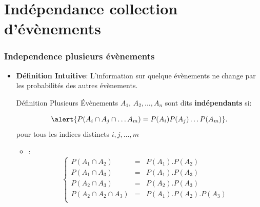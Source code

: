 \documentclass{beamer}
\begin{document}
\section{Indépendance collection d'évènements}
\begin{frame}[t]
  \frametitle{Independence plusieurs évènements}
 \begin{itemize}
   \small
   \item \textbf{Définition Intuitive}: L'information sur quelque évènements ne
     change par les probabilités des autres évènements.
     \pause
     \begin{block}{Définition}
      \scriptsize 
      Plusieurs Évènements $A_1$, $A_2,\ldots, A_n$ sont dits
      \alert{\textbf{indépendants}} si:

      \begin{equation*}
        \alert{P(A_i\cap A_j\cap \ldots A_m) = P(A_i)P(A_j)\ldots P(A_m)} .
      \end{equation*}
pour tous les indices distincts $i,j,\ldots, m$
     \end{block}
\pause
     \begin{itemize}
       \item {}:
$$
\left\{
  \begin{array}{lll}
    P(A_1\cap A_2) &=& P(A_1).P(A_2) \\
    P(A_1\cap A_3) &=& P(A_1).P(A_3) \\
    P(A_2\cap A_3) &=& P(A_2).P(A_3) \\
    P(A_2\cap A_2\cap A_3) &=& P(A_1).P(A_2).P(A_3) \\
  \end{array}\right.
$$
     \end{itemize}
 \end{itemize} 
\end{frame}
\end{document}
